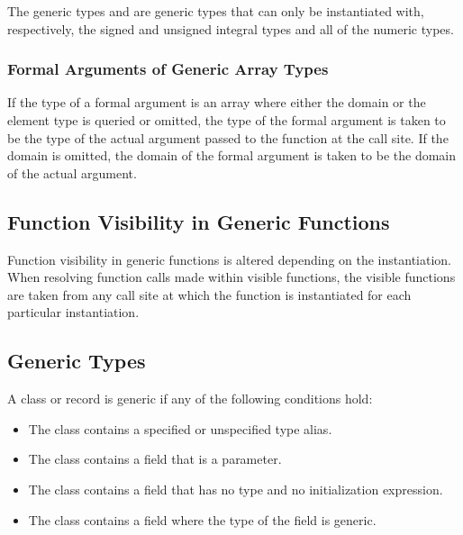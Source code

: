 The generic types  and  are generic types
that can only be instantiated with, respectively, the signed and
unsigned integral types and all of the numeric types.

\subsubsection{Formal Arguments of Generic Array Types}
\label{Formal_Arguments_of_Generic_Array_Types}

If the type of a formal argument is an array where either the domain
or the element type is queried or omitted, the type of the formal
argument is taken to be the type of the actual argument passed to the
function at the call site.  If the domain is omitted, the domain of
the formal argument is taken to be the domain of the actual argument.

\subsection{Function Visibility in Generic Functions}
\label{Function_Visibility_in_Generic_Functions}

Function visibility in generic functions is altered depending on the
instantiation.  When resolving function calls made within visible
functions, the visible functions are taken from any call site at which
the function is instantiated for each particular instantiation.

\subsection{Generic Types}
\label{Generic_Types}

A class or record is generic if any of the following conditions hold:
\begin{itemize}
\item
The class contains a specified or unspecified type alias.
\item
The class contains a field that is a parameter.
\item
The class contains a field that has no type and no initialization
expression.
\item
The class contains a field where the type of the field is generic.
\end{itemize}

